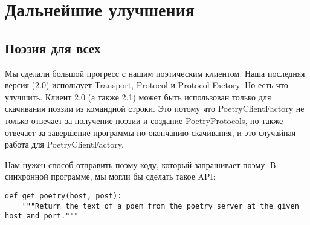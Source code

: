

 
\section{Дальнейшие улучшения\label{sec:part6}}

\subsection{Поэзия для всех}


Мы сделали большой прогресс с нашим поэтическим клиентом. 
Наша последняя версия (2.0) использует Transport, Protocol и 
Protocol Factory. Но есть что улучшить. 
Клиент 2.0 (а также 2.1) может быть использован только для 
скачивания поэзии из командной строки. Это потому что 
PoetryClientFactory не только отвечает за получение поэзии и 
создание PoetryProtocols, но 
также отвечает за завершение программы по окончанию скачивания, 
и это случайная работа для PoetryClientFactory.



Нам нужен способ отправить поэму коду, который 
запрашивает поэму. В синхронной программе, мы могли бы 
сделать такое API:

 \begin{verbatim}
def get_poetry(host, post):
    """Return the text of a poem from the poetry server at the given host and port."""
\end{verbatim} 


